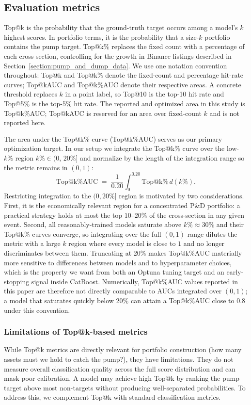 \documentclass{ieeeaccess}
\begin{document}
\subsection{Evaluation metrics}
\label{sec:evaluation_metrics}
Top@k is the probability that the ground-truth target occurs among a model's $k$ highest scores. In portfolio terms, it is the probability that a size-$k$ portfolio contains the pump target. Top@k\% replaces the fixed count with a percentage of each cross-section, controlling for the growth in Binance listings described in Section~\ref{section:pump_and_dump_data}. We use one notation convention throughout: Top@k and Top@k\% denote the fixed-count and percentage hit-rate curves; Top@kAUC and Top@k\%AUC denote their respective areas. A concrete threshold replaces $k$ in a point label, so Top@10 is the top-10 hit rate and Top@5\% is the top-5\% hit rate. The reported and optimized area in this study is Top@k\%AUC; Top@kAUC is reserved for an area over fixed-count $k$ and is not reported here.

The area under the Top@k\% curve (Top@k\%AUC) serves as our primary optimization target. In our setup we integrate the Top@k\% curve over the low-$k\%$ region $k\% \in (0,\,20\%]$ and normalize by the length of the integration range so the metric remains in $(0,1)$:
\begin{equation}
    \mathrm{Top@k\%AUC} \;=\; \frac{1}{0.20}\int_{0}^{0.20} \mathrm{Top@k\%}\,d(k\%).
    \label{eq:topkpauc}
\end{equation}
Restricting integration to the $(0,20\%]$ region is motivated by two considerations. First, it is the economically relevant region for a concentrated P\&D portfolio: a practical strategy holds at most the top $10$--$20\%$ of the cross-section in any given event. Second, all reasonably-trained models saturate above $k\% \approx 30\%$ and their Top@k\% curves converge, so integrating over the full $(0,1)$ range dilutes the metric with a large $k$ region where every model is close to $1$ and no longer discriminates between them. Truncating at $20\%$ makes Top@k\%AUC materially more sensitive to differences between models and to hyperparameter choices, which is the property we want from both an Optuna tuning target and an early-stopping signal inside CatBoost. Numerically, Top@k\%AUC values reported in this paper are therefore not directly comparable to AUCs integrated over $(0,1)$; a model that saturates quickly below $20\%$ can attain a Top@k\%AUC close to $0.8$ under this convention.

\subsubsection{Limitations of Top@k-based metrics}
While Top@k metrics are directly relevant for portfolio construction (how many assets must we hold to catch the pump?), they have limitations. They do not measure overall classification quality across the full score distribution and can mask poor calibration. A model may achieve high Top@k by ranking the pump target above most non-targets without producing well-separated probabilities. To address this, we complement Top@k with standard classification metrics.
\end{document}
